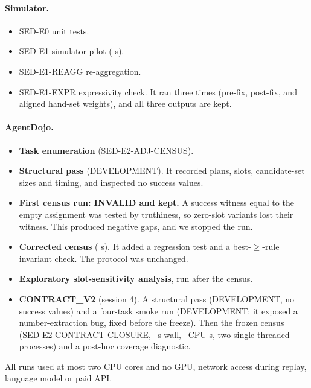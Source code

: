 \documentclass{article}
\begin{document}
\paragraph{Simulator.}
\begin{itemize}
\item SED-E0 unit tests.
\item SED-E1 simulator pilot (\EOneWall{} s).
\item SED-E1-REAGG re-aggregation.
\item SED-E1-EXPR expressivity check. It ran three times (pre-fix, post-fix,
and aligned hand-set weights), and all three outputs are kept.
\end{itemize}

\paragraph{AgentDojo.}
\begin{itemize}
\item \textbf{Task enumeration} (SED-E2-ADJ-CENSUS).
\item \textbf{Structural pass} (DEVELOPMENT). It recorded plans, slots,
candidate-set sizes and timing, and inspected no success values.
\item \textbf{First census run: INVALID and kept.} A success witness equal
to the empty assignment was tested by truthiness, so zero-slot variants
lost their witness. This produced negative gaps, and we stopped the run.
\item \textbf{Corrected census} (\AdjWall{} s). It added a regression test
and a best-$\ge$-rule invariant check. The protocol was unchanged.
\item \textbf{Exploratory slot-sensitivity analysis}, run after the census.
\item \textbf{CONTRACT\_V2} (session 4). A structural pass (DEVELOPMENT,
no success values) and a four-task smoke run (DEVELOPMENT; it exposed a
number-extraction bug, fixed before the freeze). Then the frozen census
(SED-E2-CONTRACT-CLOSURE, \CcWall{}~s wall, \CcCPU{}~CPU-s, two
single-threaded processes) and a post-hoc coverage diagnostic.
\end{itemize}
All runs used at most two CPU cores and no GPU, network access during
replay, language model or paid API.

\begin{table}[h]
\caption{Per delegated argument, instance-split test set. Counts are over
\emph{arguments}; one billing template has two delegated arguments of which
only one is attacked, so ``present'' is below ``args'' in attack conditions.
ENGINEERING ONLY.}
\label{tab:boundary}
\centering\scriptsize

\end{table}
\end{document}

